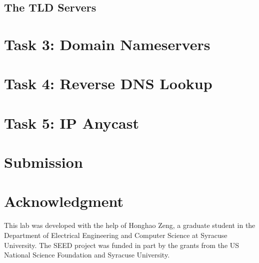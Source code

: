 \subsection{The TLD Servers} 



\section{Task 3: Domain Nameservers} 




\section{Task 4: Reverse DNS Lookup} 




\section{Task 5: IP Anycast}










\section{Submission}





\section*{Acknowledgment} 

This lab was developed with the help of Honghao Zeng, 
a graduate student in the Department of Electrical Engineering 
and Computer Science at Syracuse University. 
The SEED project was funded in part 
by the grants from the US National Science Foundation
and Syracuse University.





